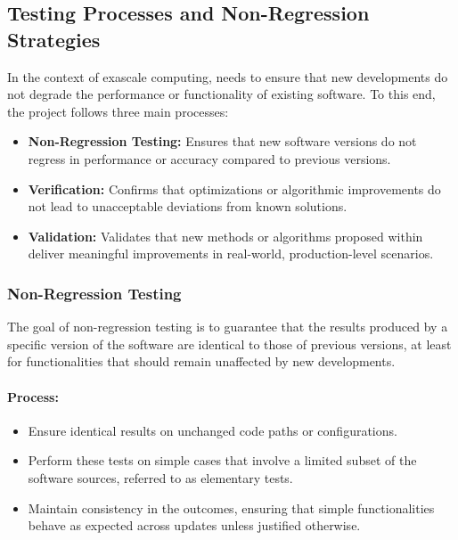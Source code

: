 \subsection{Testing Processes and Non-Regression Strategies}
\label{sec:testing-processes}

In the context of exascale computing, \exama needs to ensure that new developments do not degrade the performance or functionality of existing software.
To this end, the \exama project follows three main processes:

\begin{itemize}
    \item \textbf{Non-Regression Testing:} Ensures that new software versions do not regress in performance or accuracy compared to previous versions.
    \item \textbf{Verification:} Confirms that optimizations or algorithmic improvements do not lead to unacceptable deviations from known solutions.
    \item \textbf{Validation:} Validates that new methods or algorithms proposed within \exama deliver meaningful improvements in real-world, production-level scenarios.
\end{itemize}


\subsubsection{Non-Regression Testing}
\label{sec:non-regression}

The goal of non-regression testing is to guarantee that the results produced by a specific version of the software are identical to those of previous versions, at least for functionalities that should remain unaffected by new developments.

\paragraph{Process:}
\begin{itemize}
    \item Ensure identical results on unchanged code paths or configurations.
    \item Perform these tests on simple cases that involve a limited subset of the software sources, referred to as elementary tests.
    \item Maintain consistency in the outcomes, ensuring that simple functionalities behave as expected across updates unless justified otherwise.
\end{itemize}

